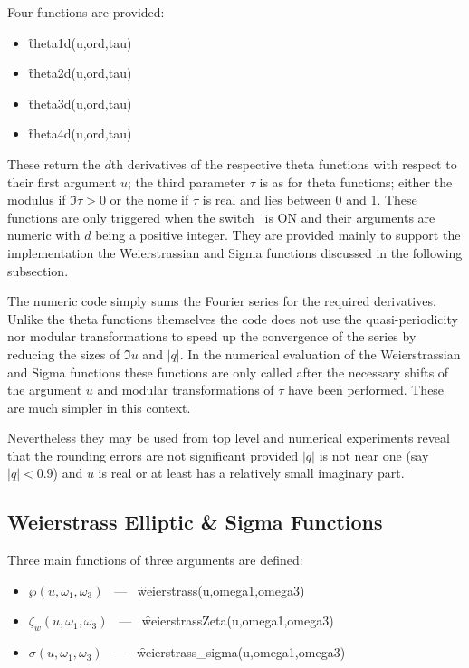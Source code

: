 \hypertarget{THETAD}{}
\hypertarget{operator:THETA1D}{}
\hypertarget{operator:THETA2D}{}
\hypertarget{operator:THETA3D}{}
\hypertarget{operator:THETA4D}{}
 
Four functions are provided:
\begin{itemize}
\item \f{theta1d(u,ord,tau)}
\item \f{theta2d(u,ord,tau)}
\item \f{theta3d(u,ord,tau)}
\item \f{theta4d(u,ord,tau)}
\end{itemize}
These return the $d$th derivatives of the respective theta functions
with respect to their first argument $u$; the third parameter $\tau$ is as
for theta functions; either the modulus if $\Im\tau >0$ or the nome if $\tau$
is real and lies between 0 and 1.
These functions are only triggered when the switch
\ is ON and their arguments are numeric with
$d$ being a positive integer.  They are provided mainly to support the
implementation the Weierstrassian and Sigma functions discussed in the
following subsection.

The numeric code simply sums the Fourier series for the required derivatives.
Unlike the theta functions themselves the code does not use the quasi-periodicity nor
modular transformations to speed  up the convergence of the series by reducing the sizes
of $\Im u$ and $|q|$.  In the numerical evaluation of the Weierstrassian and Sigma functions
these functions are only called after the necessary shifts of the argument $u$ and modular
transformations of $\tau$ have been performed. These are much simpler in this context.

Nevertheless they may be used from top level and numerical experiments reveal that the rounding
errors are not significant provided $|q|$ is not near one (say $|q|<0.9$)
and $u$ is real or at least has a relatively small imaginary part.

\subsection{Weierstrass Elliptic \& Sigma Functions}
Three main functions of three arguments are defined:
\hypertarget{WEIERSTRASS}{}
\hypertarget{WEIERSTRASSZETA}{}
\hypertarget{SIGMA}{}
\hypertarget{operator:WEIERSTRASS_SIGMA}{}
\hypertarget{operator:WEIERSTRASS}{}
\hypertarget{operator:WEIERSTRASSZETA}{}
\begin{itemize}
\item  $\wp(u, \omega_1, \omega_3)$ \ --- \ \f{weierstrass(u,omega1,omega3)}
\item $\zeta_w(u, \omega_1, \omega_3)$ \ --- \ \f{weierstrassZeta(u,omega1,omega3)}
\item $\sigma(u, \omega_1, \omega_3)$ \ --- \ \f{weierstrass\_sigma(u,omega1,omega3)}
\end{itemize}


